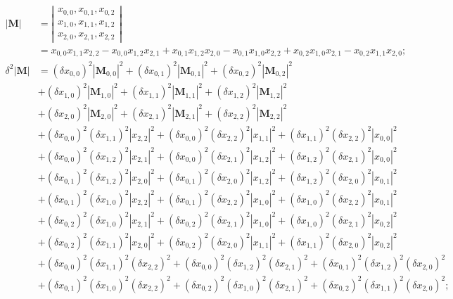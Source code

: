 \documentclass[twoside]{article}
\numberwithin{equation}{section}
\begin{document}
\begin{align*}
|\mathbf{M}| &= \left| \begin{matrix} x_{0,0}, x_{0,1}, x_{0,2} \\ x_{1,0}, x_{1,1}, x_{1,2} \\ x_{2,0}, x_{2,1}, x_{2,2} \end{matrix} \right| \\
&= x_{0,0} x_{1,1} x_{2,2} - x_{0,0} x_{1,2} x_{2,1} 
   	+ x_{0,1} x_{1,2} x_{2,0} - x_{0,1} x_{1,0} x_{2,2}
    + x_{0,2} x_{1,0} x_{2,1} -  x_{0,2} x_{1,1} x_{2,0}; \\
\delta^2 |\mathbf{M}| &= (\delta x_{0,0})^2 |\mathbf{M}_{0,0}|^2 + (\delta x_{0,1})^2 |\mathbf{M}_{0,1}|^2 + (\delta x_{0,2})^2 |\mathbf{M}_{0,2}|^2 \\
  &+ (\delta x_{1,0})^2 |\mathbf{M}_{1,0}|^2 + (\delta x_{1,1})^2 |\mathbf{M}_{1,1}|^2 + (\delta x_{1,2})^2 |\mathbf{M}_{1,2}|^2 \\
  &+ (\delta x_{2,0})^2 |\mathbf{M}_{2,0}|^2 + (\delta x_{2,1})^2 |\mathbf{M}_{2,1}|^2 + (\delta x_{2,2})^2 |\mathbf{M}_{2,2}|^2 \\
  &+ (\delta x_{0,0})^2 (\delta x_{1,1})^2 |x_{2,2}|^2 + (\delta x_{0,0})^2 (\delta x_{2,2})^2 |x_{1,1}|^2 + (\delta x_{1,1})^2 (\delta x_{2,2})^2 |x_{0,0}|^2 \\
  &+ (\delta x_{0,0})^2 (\delta x_{1,2})^2 |x_{2,1}|^2 + (\delta x_{0,0})^2 (\delta x_{2,1})^2 |x_{1,2}|^2 + (\delta x_{1,2})^2 (\delta x_{2,1})^2 |x_{0,0}|^2 \\
  &+ (\delta x_{0,1})^2 (\delta x_{1,2})^2 |x_{2,0}|^2 + (\delta x_{0,1})^2 (\delta x_{2,0})^2 |x_{1,2}|^2 + (\delta x_{1,2})^2 (\delta x_{2,0})^2 |x_{0,1}|^2 \\
  &+ (\delta x_{0,1})^2 (\delta x_{1,0})^2 |x_{2,2}|^2 + (\delta x_{0,1})^2 (\delta x_{2,2})^2 |x_{1,0}|^2 + (\delta x_{1,0})^2 (\delta x_{2,2})^2 |x_{0,1}|^2 \\
  &+ (\delta x_{0,2})^2 (\delta x_{1,0})^2 |x_{2,1}|^2 + (\delta x_{0,2})^2 (\delta x_{2,1})^2 |x_{1,0}|^2 + (\delta x_{1,0})^2 (\delta x_{2,1})^2 |x_{0,2}|^2 \\
  &+ (\delta x_{0,2})^2 (\delta x_{1,1})^2 |x_{2,0}|^2 + (\delta x_{0,2})^2 (\delta x_{2,0})^2 |x_{1,1}|^2 + (\delta x_{1,1})^2 (\delta x_{2,0})^2 |x_{0,2}|^2 \\
  &+ (\delta x_{0,0})^2 (\delta x_{1,1})^2 (\delta x_{2,2})^2 + (\delta x_{0,0})^2 (\delta x_{1,2})^2 (\delta x_{2,1})^2 + (\delta x_{0,1})^2 (\delta x_{1,2})^2 (\delta x_{2,0})^2 \\
  &+ (\delta x_{0,1})^2 (\delta x_{1,0})^2 (\delta x_{2,2})^2 + (\delta x_{0,2})^2 (\delta x_{1,0})^2 (\delta x_{2,1})^2 + (\delta x_{0,2})^2 (\delta x_{1,1})^2 (\delta x_{2,0})^2;\\
\end{align*}
\end{document}
